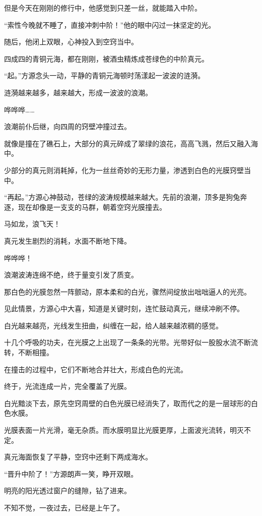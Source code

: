 \begin{this_body}
但是今天在刚刚的修行中，他感觉到只差一丝，就能踏入中阶。

“索性今晚就不睡了，直接冲刺中阶！”他的眼中闪过一抹坚定的光。

随后，他闭上双眼，心神投入到空窍当中。

四成四的青铜元海，都在刚刚，被酒虫精炼成苍绿色的中阶真元。

“起。”方源念头一动，平静的青铜元海顿时荡漾起一波波的涟漪。

涟漪越来越多，越来越大，形成一波波的浪潮。

哗哗哗……

浪潮前仆后继，向四周的窍壁冲撞过去。

就像是撞在了礁石上，大部分的真元碎成了翠绿的浪花，高高飞溅，然后又融入海中。

少部分的真元则消耗掉，化为一丝丝奇妙的无形力量，渗透到白色的光膜窍壁当中。

“再起。”方源心神鼓动，苍绿的波涛规模越来越大。先前的浪潮，顶多是狗兔奔逐，现在却像是一支支的马群，朝着空窍光膜撞去。

马如龙，浪飞天！

真元发生剧烈的消耗，水面不断地下降。

哗哗哗！

浪潮波涛连绵不绝，终于量变引发了质变。

那白色的光膜忽然一阵颤动，原本柔和的白光，骤然间绽放出咄咄逼人的光亮。

见此情景，方源心中大喜，知道是关键时刻，连忙鼓动真元，继续冲刷不停。

白光越来越亮，光线发生扭曲，纠缠在一起，给人越来越浓稠的感觉。

十几个呼吸的功夫，在光膜之上出现了一条条的光带。光带好似一股股水流不断流转，不断相撞。

在撞击的过程中，它们不断地合并壮大，形成白色的光流。

终于，光流连成一片，完全覆盖了光膜。

白光黯淡下去，原先空窍周壁的白色光膜已经消失了，取而代之的是一层球形的白色水膜。

光膜表面一片光滑，毫无杂质。而水膜明显比光膜更厚，上面波光流转，明灭不定。

真元海面恢复了平静，空窍中还剩下两成海水。

“晋升中阶了！”方源朗声一笑，睁开双眼。

明亮的阳光透过窗户的缝隙，钻了进来。

不知不觉，一夜过去，已经是上午了。

\end{this_body}


